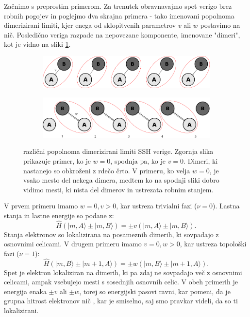 Začnimo s preprostim primerom. Za trenutek obravnavajmo spet verigo brez robnih pogojev in poglejmo dva skrajna primera - tako imenovani popolnoma dimerizirani limiti, kjer enega od sklopitvenih parametrov $v$ ali $w$ postavimo na nič. Posledično veriga razpade na nepovezane komponente, imenovane "dimeri", kot je vidno na sliki \ref{fig:dimerized}.

\begin{figure}[H]
\centering
\begin{subfigure}{.9\textwidth}
\includegraphics[width=\linewidth]{Figures/MyDimerized1.pdf}
\end{subfigure}
\begin{subfigure}{.9\textwidth}
\includegraphics[width=\linewidth]{Figures/MyDimerized2.pdf}
\end{subfigure}
\caption{različni popolnoma dimerizirani limiti SSH verige. Zgornja slika prikazuje primer, ko je $w=0$, spodnja pa, ko je $v=0$. Dimeri, ki nastanejo so obkroženi z rdečo črto. V primeru, ko velja $w=0$, je vsako mesto del nekega dimera, medtem ko na spodnji sliki dobro vidimo mesti, ki nista del dimerov in ustrezata robnim stanjem.}
\label{fig:dimerized}
\end{figure}

V prvem primeru imamo $w=0, v > 0$, kar ustreza trivialni fazi ($\nu=0$). Lastna stanja in lastne energije so podane z:
\begin{equation}
\hat{H} ( |m, A \rangle \pm | m , B \rangle) = \pm v( |m, A \rangle \pm | m, B \rangle ).
\end{equation}
Stanja elektronov so lokalizirana na posameznih dimerih, ki sovpadajo z osnovnimi celicami.
V drugem primeru imamo $v=0, w>0$, kar ustreza topološki fazi ($\nu = 1$):
\begin{equation}
\hat{H} ( |m, B \rangle \pm | m + 1 , A \rangle) = \pm w( |m, B \rangle \pm | m+1,A \rangle ).
\end{equation}
Spet je elektron lokaliziran na dimerih, ki pa zdaj ne sovpadajo več z osnovnimi celicami, ampak vsebujejo mesti s sosednjih osnovnih celic.
V obeh primerih je energija enaka $\pm v$ ali $\pm w$, torej so energijski pasovi ravni, kar pomeni, da je grupna hitrost elektronov nič \cite{ashcroft}, kar je smiselno, saj smo pravkar videli, da so ti lokalizirani.

